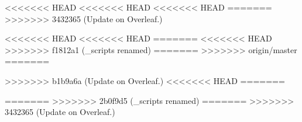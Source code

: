 

% 
% 
\setcounter{chapter}{1}
<<<<<<< HEAD
<<<<<<< HEAD
<<<<<<< HEAD
=======
>>>>>>> 3432365 (Update on Overleaf.)

<<<<<<< HEAD
<<<<<<< HEAD
% 
% 
=======
<<<<<<< HEAD
>>>>>>> f1812a1 (_scripts renamed)
=======
>>>>>>> origin/master
% 
% 
=======


>>>>>>> b1b9a6a (Update on Overleaf.)
<<<<<<< HEAD
=======

% 
% 
=======
% 
% 
% 
>>>>>>> 2b0f9d5 (_scripts renamed)
=======
>>>>>>> 3432365 (Update on Overleaf.)
% 
% 


